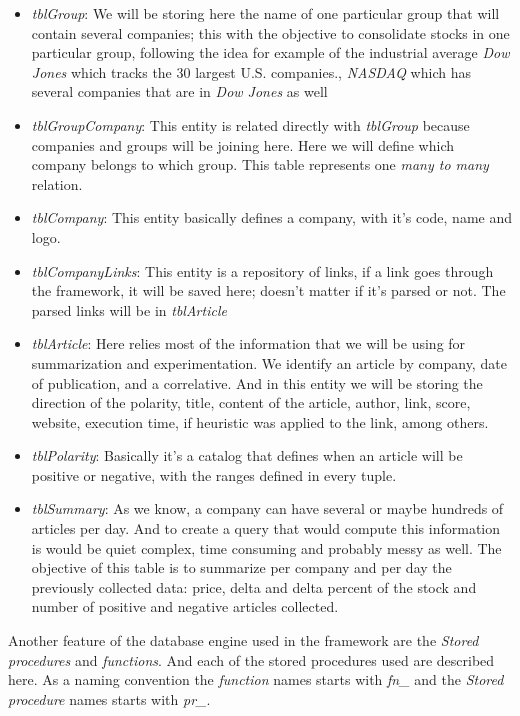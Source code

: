 \begin{itemize}
	\item \emph{tblGroup}: We will be storing here the name of one particular group that will contain several companies; this with the objective to consolidate stocks in one particular group, following the idea for example of the industrial average \emph{Dow Jones} which tracks the 30 largest U.S. companies., \emph{NASDAQ} which has several companies that are in \emph{Dow Jones} as well
	\item \emph{tblGroupCompany}: This entity is related directly with \emph{tblGroup} because companies and groups will be joining here. Here we will define which company belongs to which group. This table represents one \emph{many to many} relation. 
	\item \emph{tblCompany}: This entity basically defines a company, with it's code, name and logo.
	\item \emph{tblCompanyLinks}: This entity is a repository of links, if a link goes through the framework, it will be saved here; doesn't matter if it's parsed or not. The parsed links will be in \emph{tblArticle} 
	\item \emph{tblArticle}: Here relies most of the information that we will be using for summarization and experimentation. We identify an article by company, date of publication, and a correlative. And in this entity we will be storing the direction of the polarity, title, content of the article, author, link, score, website, execution time, if heuristic was applied to the link, among others. 
	\item \emph{tblPolarity}: Basically it's a catalog that defines when an article will be positive or negative, with the ranges defined in every tuple.
	\item \emph{tblSummary}: As we know, a company can have several or maybe hundreds of articles per day. And to create a query that would compute this information is would be quiet complex, time consuming and probably messy as well. The objective of this table is to summarize per company and per day the previously collected data: price, delta and delta percent of the stock and number of positive and negative articles collected.
\end{itemize}

Another feature of the database engine used in the framework are the \emph{Stored procedures} and \emph{functions}. And each of the stored procedures used are described here. As a naming convention the \emph{function} names starts with \emph{fn\_} and the  \emph{Stored procedure} names starts with \emph{pr\_}.

